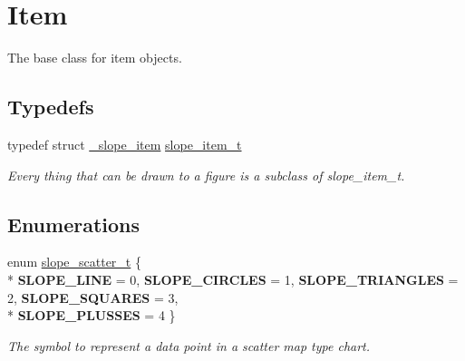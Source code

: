 \hypertarget{group__Item}{\section{Item}
\label{group__Item}
}


The base class for item objects.  


\subsection*{Typedefs}
\begin{DoxyCompactItemize}
\item 
\hypertarget{group__Item_ga2616141f0e164a876049da51ea3a8646}{typedef struct \hyperlink{struct__slope__item}{\+\_\+slope\+\_\+item} \hyperlink{group__Item_ga2616141f0e164a876049da51ea3a8646}{slope\+\_\+item\+\_\+t}}\label{group__Item_ga2616141f0e164a876049da51ea3a8646}

\begin{DoxyCompactList}\small\item\em Every thing that can be drawn to a figure is a subclass of slope\+\_\+item\+\_\+t. \end{DoxyCompactList}\end{DoxyCompactItemize}
\subsection*{Enumerations}
\begin{DoxyCompactItemize}
\item 
\hypertarget{group__Item_ga7be66725a3a198bcbd9434e6d3ad70c5}{enum \hyperlink{group__Item_ga7be66725a3a198bcbd9434e6d3ad70c5}{slope\+\_\+scatter\+\_\+t} \{ \\*
{\bfseries S\+L\+O\+P\+E\+\_\+\+L\+I\+N\+E} = 0, 
{\bfseries S\+L\+O\+P\+E\+\_\+\+C\+I\+R\+C\+L\+E\+S} = 1, 
{\bfseries S\+L\+O\+P\+E\+\_\+\+T\+R\+I\+A\+N\+G\+L\+E\+S} = 2, 
{\bfseries S\+L\+O\+P\+E\+\_\+\+S\+Q\+U\+A\+R\+E\+S} = 3, 
\\*
{\bfseries S\+L\+O\+P\+E\+\_\+\+P\+L\+U\+S\+S\+E\+S} = 4
 \}}\label{group__Item_ga7be66725a3a198bcbd9434e6d3ad70c5}

\begin{DoxyCompactList}\small\item\em The symbol to represent a data point in a scatter map type chart. \end{DoxyCompactList}\end{DoxyCompactItemize}
